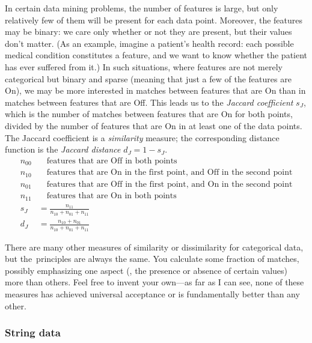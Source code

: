 In certain data mining problems, the number of features is large, but
only relatively few of them will be present for each data point.
Moreover, the features may be binary: we care only whether or not they
are present, but their values don't matter.  (As an example, imagine a
patient's health record: each possible medical condition constitutes a
feature, and we want to know whether the patient has ever suffered
from it.)  In such situations, where features are not merely
categorical but binary and sparse (meaning that just a few of the
features are On), we may be more interested in matches between
features that are On than in matches between features
that are Off. This leads us to the \emph{Jaccard coefficient} $s_J$,
 which is the
number\vadjust{\pagebreak} of matches between features that are On for both
points, divided by the number of features that are On in at least one of the
data points. The Jaccard coefficient is a \emph{similarity} measure; the
corresponding distance function is the \emph{Jaccard distance}
$d_J = 1 - s_J$.
\begin{align*}
n_{00} & \quad \text{features that are Off in both points} \\
n_{10} & \quad \text{features that are On in the first point, 
                     and Off in the second point} \\
n_{01} & \quad \text{features that are Off in the first point, 
                     and On in the second point} \\
n_{11} & \quad \text{features that are On in both points} \\
s_J & = \frac{n_{11}}{n_{10} + n_{01} + n_{11}} \\
d_J & = \frac{n_{10} + n_{01}}{n_{10} + n_{01} + n_{11}}
\end{align*}

There are many other measures of similarity or dissimilarity for
categorical data, but the~principles are always the same. You
calculate some fraction of matches, possibly emphasizing one aspect
(\eg, the presence or absence of certain values) more than others.
Feel free to invent your own---as far as I can see, none of these
measures has achieved universal acceptance or is fundamentally better
than any other.

\vspace*{-6pt}
\subsubsection{String data}

